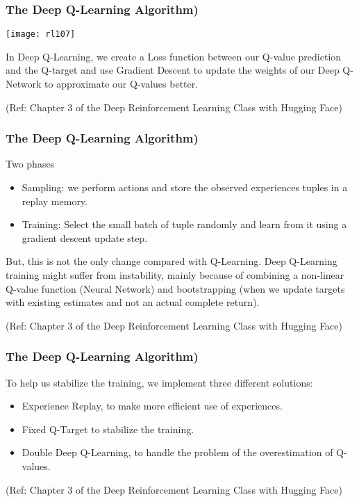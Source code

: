 \begin{frame}[fragile]\frametitle{The Deep Q-Learning Algorithm)}

\begin{center}
\texttt{[image: rl107]}
\end{center}

In Deep Q-Learning, we create a Loss function between our Q-value prediction and the Q-target and use Gradient Descent to update the weights of our Deep Q-Network to approximate our Q-values better.

{\tiny (Ref: Chapter 3 of the Deep Reinforcement Learning Class with Hugging Face)}

\end{frame}

\begin{frame}[fragile]\frametitle{The Deep Q-Learning Algorithm)}

Two phases

\begin{itemize}
\item Sampling: we perform actions and store the observed experiences tuples in a replay memory.
\item Training: Select the small batch of tuple randomly and learn from it using a gradient descent update step.
\end{itemize}

But, this is not the only change compared with Q-Learning. Deep Q-Learning training might suffer from instability, mainly because of combining a non-linear Q-value function (Neural Network) and bootstrapping (when we update targets with existing estimates and not an actual complete return).

{\tiny (Ref: Chapter 3 of the Deep Reinforcement Learning Class with Hugging Face)}

\end{frame}

\begin{frame}[fragile]\frametitle{The Deep Q-Learning Algorithm)}

To help us stabilize the training, we implement three different solutions:


\begin{itemize}
\item Experience Replay, to make more efficient use of experiences.
\item Fixed Q-Target to stabilize the training.
\item Double Deep Q-Learning, to handle the problem of the overestimation of Q-values.
\end{itemize}

{\tiny (Ref: Chapter 3 of the Deep Reinforcement Learning Class with Hugging Face)}

\end{frame}


